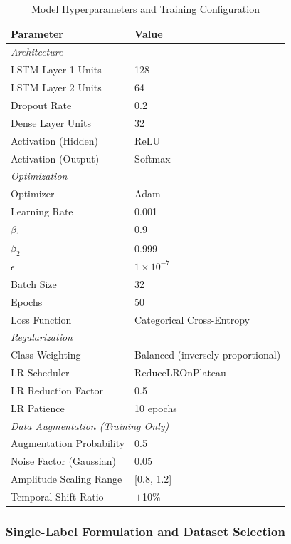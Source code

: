 \documentclass[conference]{IEEEtran}
\begin{document}
\begin{table}[htbp]
\caption{Model Hyperparameters and Training Configuration}
\label{tab:hyperparameters}
\centering
\begin{tabular}{ll}
\toprule
\textbf{Parameter} & \textbf{Value} \\
\midrule
\multicolumn{2}{l}{\textit{Architecture}} \\
LSTM Layer 1 Units & 128 \\
LSTM Layer 2 Units & 64 \\
Dropout Rate & 0.2 \\
Dense Layer Units & 32 \\
Activation (Hidden) & ReLU \\
Activation (Output) & Softmax \\
\midrule
\multicolumn{2}{l}{\textit{Optimization}} \\
Optimizer & Adam \\
Learning Rate & 0.001 \\
$\beta_1$ & 0.9 \\
$\beta_2$ & 0.999 \\
$\epsilon$ & $1 \times 10^{-7}$ \\
Batch Size & 32 \\
Epochs & 50 \\
Loss Function & Categorical Cross-Entropy \\
\midrule
\multicolumn{2}{l}{\textit{Regularization}} \\
Class Weighting & Balanced (inversely proportional) \\
LR Scheduler & ReduceLROnPlateau \\
LR Reduction Factor & 0.5 \\
LR Patience & 10 epochs \\
\midrule
\multicolumn{2}{l}{\textit{Data Augmentation (Training Only)}} \\
Augmentation Probability & 0.5 \\
Noise Factor (Gaussian) & 0.05 \\
Amplitude Scaling Range & [0.8, 1.2] \\
Temporal Shift Ratio & $\pm$10\% \\
\bottomrule
\end{tabular}
\end{table}

\subsubsection{Single-Label Formulation and Dataset Selection}
\end{document}

